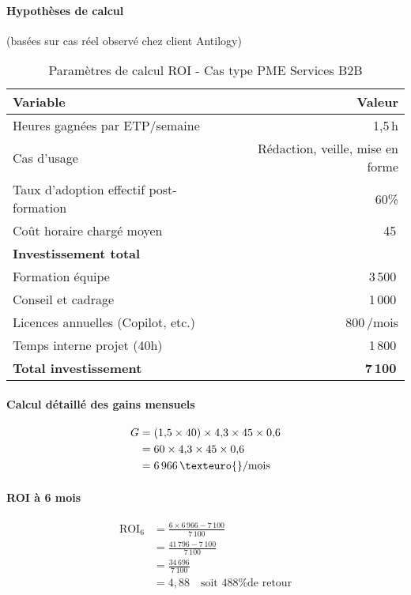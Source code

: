 \paragraph{Hypothèses de calcul} (basées sur cas réel observé chez client Antilogy)

\begin{table}[ht]
\centering
\caption{Paramètres de calcul ROI - Cas type PME Services B2B}
\label{tab:roi_parameters}
\begin{tabular}{@{}lr@{}}
\toprule
\textbf{Variable} & \textbf{Valeur} \\
\midrule
Heures gagnées par ETP/semaine & 1{,}5\,h \\
Cas d'usage & Rédaction, veille, mise en forme \\
Taux d'adoption effectif post-formation & 60\% \\
Coût horaire chargé moyen & 45\,\texteuro{} \\
\midrule
\textbf{Investissement total} & \\
Formation équipe & 3\,500\,\texteuro{} \\
Conseil et cadrage & 1\,000\,\texteuro{} \\
Licences annuelles (Copilot, etc.) & 800\,\texteuro{}/mois \\
Temps interne projet (40h) & 1\,800\,\texteuro{} \\
\textbf{Total investissement} & \textbf{7\,100\,\texteuro{}} \\
\bottomrule
\end{tabular}
\end{table}

\paragraph{Calcul détaillé des gains mensuels}
\begin{align}
G &= (1{,}5 \times 40) \times 4{,}3 \times 45 \times 0{,}6 \\
&= 60 \times 4{,}3 \times 45 \times 0{,}6 \\
&= 6\,966\,\texteuro{}/\text{mois}
\end{align}

\paragraph{ROI à 6 mois}
\begin{align}
\text{ROI}_6 &= \frac{6 \times 6\,966 - 7\,100}{7\,100} \\
&= \frac{41\,796 - 7\,100}{7\,100} \\
&= \frac{34\,696}{7\,100} \\
&= 4{,}88 \quad \text{soit 488\% de retour}
\end{align}

